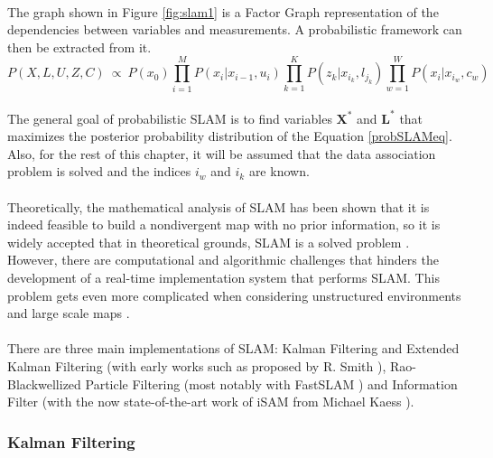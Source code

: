 \documentclass[11pt]{article}
\begin{document}
	\paragraph{}
	The graph shown in Figure \ref{fig:slam1} is a Factor Graph representation of the dependencies between variables and measurements. A probabilistic framework can then be extracted from it. 
	\begin{equation}
	P(X,L,U,Z,C)\ \propto \ P(x_0)\prod_{i=1}^{M}P(x_i|x_{i-1}, u_i)\prod_{k=1}^{K}P(z_k|x_{i_k},l_{j_k})\prod_{w=1}^{W}P(x_i|x_{i_w}, c_w)
	\label{probSLAMeq}
	\end{equation}
	\paragraph{}
	The general goal of probabilistic SLAM is to find variables $\mathbf{X^*}$ and $\mathbf{L^*}$ that maximizes the posterior probability distribution of the Equation \ref{probSLAMeq}. Also, for the rest of this chapter, it will be assumed that the data association problem is solved and the indices $i_w$ and $i_k$ are known. 

	\paragraph{}
	Theoretically, the mathematical analysis of SLAM has been shown that it is indeed feasible to build a nondivergent map with no prior information, so it is widely accepted that in theoretical grounds, SLAM is a solved problem \cite{SLAMPartI}\cite{Cadena}\cite{CsorbaThesis}\cite{938381}. However, there are computational and algorithmic challenges that hinders the development of a real-time implementation system that performs SLAM. This problem gets even more complicated when considering unstructured environments and large scale maps \cite{SLAMPartII}.
	
	\paragraph{}
	There are three main implementations of SLAM: Kalman Filtering and Extended Kalman Filtering (with early works such as proposed by R. Smith \cite{Smith:1990:EUS:93002.93291}), Rao-Blackwellized Particle Filtering (most notably with FastSLAM \cite{Montemerlo02fastslam:a}) and Information Filter (with the now state-of-the-art work of iSAM from Michael Kaess \cite{Kaess08tro}).

	\subsubsection{Kalman Filtering}
\end{document}
